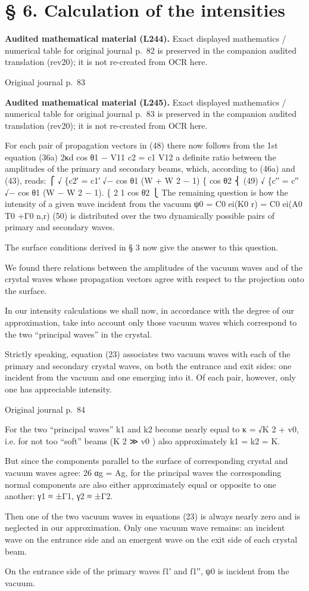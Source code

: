 \documentclass[10pt]{article}
\newcommand{\origpage}[1]{\par\medskip\noindent\hfill{\small\color{notegray}Original journal p.~#1}\hfill\mbox{}\par\smallskip}
\newcommand{\mathref}[2]{\par\smallskip\noindent\colorbox{gray!8}{\parbox{0.95\linewidth}{\small\color{notegray}\textbf{Audited mathematical material (L#1).} Exact displayed mathematics / numerical table for original journal p.~#2 is preserved in the companion audited translation (rev20); it is not re-created from OCR here.}}\par\smallskip}
\begin{document}
\section*{§ 6. Calculation of the intensities}
\mathref{244}{82}
\origpage{83}
\mathref{245}{83}
For each pair of propagation vectors in (48) there now follows from the 1st equation (36a) 2κd cos θ1 − V11 c2 = c1 V12 a definite ratio between the amplitudes of the primary and secondary beams, which, according to (46a) and (43), reads: ⎧ √ \{c2′ = c1′ √− cos θ1 (W + W 2 − 1) \{ cos θ2 ⎨ (49) √ \{c′′ = c′′ √− cos θ1 (W − W 2 − 1). \{ 2 1 cos θ2 ⎩ The remaining question is how the intensity of a given wave incident from the vacuum ψ0 = C0 ei(K0 r) = C0 ei(A0 T0 +Γ0 n,r) (50) is distributed over the two dynamically possible pairs of primary and secondary waves.\par
The surface conditions derived in § 3 now give the answer to this question.\par
We found there relations between the amplitudes of the vacuum waves and of the crystal waves whose propagation vectors agree with respect to the projection onto the surface.\par
In our intensity calculations we shall now, in accordance with the degree of our approximation, take into account only those vacuum waves which correspond to the two “principal waves” in the crystal.\par
Strictly speaking, equation (23) associates two vacuum waves with each of the primary and secondary crystal waves, on both the entrance and exit sides: one incident from the vacuum and one emerging into it. Of each pair, however, only one has appreciable intensity.\par
\origpage{84}
For the two “principal waves” k1 and k2 become nearly equal to κ = √K 2 + v0, i.e. for not too “soft” beams (K 2 ≫ v0 ) also approximately k1 = k2 = K.\par
But since the components parallel to the surface of corresponding crystal and vacuum waves agree: 26 αg = Ag, for the principal waves the corresponding normal components are also either approximately equal or opposite to one another: γ1 ≈ ±Γ1, γ2 ≈ ±Γ2.\par
Then one of the two vacuum waves in equations (23) is always nearly zero and is neglected in our approximation. Only one vacuum wave remains: an incident wave on the entrance side and an emergent wave on the exit side of each crystal beam.\par
On the entrance side of the primary waves f1′ and f1′′, ψ0 is incident from the vacuum.\par
\end{document}
